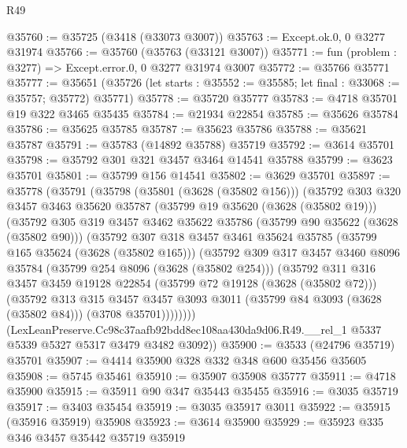 \begin{lexlean}{R49}
\begin{coremodule}
@35760 := @35725 (@3418 (@33073 @3007))
@35763 := Except.ok.{0, 0} @3277 @31974
@35766 := @35760 (@35763 (@33121 @3007))
@35771 := fun (problem : @3277) => Except.error.{0, 0} @3277 @31974 @3007
@35772 := @35766 @35771
@35777 := @35651
    (@35726 (let starts : @35552 := @35585; let final : @33068 := @35757; @35772) @35771)
@35778 := @35720 @35777
@35783 := @4718 @35701 @19 @322 @3465 @35435
@35784 := @21934 @22854
@35785 := @35626 @35784
@35786 := @35625 @35785
@35787 := @35623 @35786
@35788 := @35621 @35787
@35791 := @35783 (@14892 @35788) @35719
@35792 := @3614 @35701
@35798 := @35792 @301 @321 @3457 @3464 @14541 @35788
@35799 := @3623 @35701
@35801 := @35799 @156 @14541
@35802 := @3629 @35701
@35897 := @35778
    (@35791
      (@35798
        (@35801 (@3628 (@35802 @156)))
        (@35792
          @303
          @320
          @3457
          @3463
          @35620
          @35787
          (@35799 @19 @35620 (@3628 (@35802 @19)))
          (@35792
            @305
            @319
            @3457
            @3462
            @35622
            @35786
            (@35799 @90 @35622 (@3628 (@35802 @90)))
            (@35792
              @307
              @318
              @3457
              @3461
              @35624
              @35785
              (@35799 @165 @35624 (@3628 (@35802 @165)))
              (@35792
                @309
                @317
                @3457
                @3460
                @8096
                @35784
                (@35799 @254 @8096 (@3628 (@35802 @254)))
                (@35792
                  @311
                  @316
                  @3457
                  @3459
                  @19128
                  @22854
                  (@35799 @72 @19128 (@3628 (@35802 @72)))
                  (@35792
                    @313
                    @315
                    @3457
                    @3457
                    @3093
                    @3011
                    (@35799 @84 @3093 (@3628 (@35802 @84)))
                    (@3708 @35701))))))))
      (LexLeanPreserve.Cc98c37aafb92bdd8ec108aa430da9d06.R49.__rel_1
        @5337
        @5339
        @5327
        @5317
        @3479
        @3482
        @3092))
@35900 := @3533 (@24796 @35719) @35701
@35907 := @4414 @35900 @328 @332 @348 @600 @35456 @35605
@35908 := @5745 @35461
@35910 := @35907 @35908 @35777
@35911 := @4718 @35900
@35915 := @35911 @90 @347 @35443 @35455
@35916 := @3035 @35719
@35917 := @3403 @35454
@35919 := @3035 @35917 @3011
@35922 := @35915 (@35916 @35919) @35908
@35923 := @3614 @35900
@35929 := @35923 @335 @346 @3457 @35442 @35719 @35919

\end{coremodule}
\end{lexlean}
